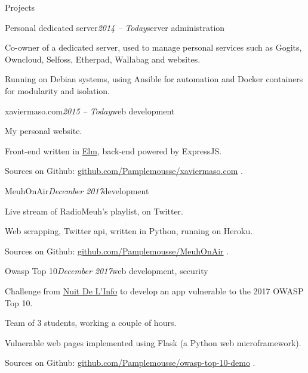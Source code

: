 \begin{rSection}{Projects}

  \begin{rSubsection}{Personal dedicated server}{\em 2014 -- Today}{server administration}{}
    \item[] Co-owner of a dedicated server, used to manage personal services such as Gogits, Owncloud, Selfoss, Etherpad, Wallabag and websites.
    \item Running on Debian systems, using Ansible for automation and Docker containers for modularity and isolation.
  \end{rSubsection}

  \begin{rSubsection}{xaviermaso.com}{\em 2015 -- Today}{web development}{}
    \item[] My personal website.
    \item Front-end written in \href{http://elm-lang.org/}{Elm}, back-end powered by ExpressJS.
    \item Sources on Github: \href{https://github.com/Pamplemousse/xaviermaso.com}{github.com/Pamplemousse/xaviermaso.com} .
  \end{rSubsection}

  \begin{rSubsection}{MeuhOnAir}{\em December 2017}{development}{}
    \item[] Live stream of RadioMeuh's playlist, on Twitter.
    \item Web scrapping, Twitter api, written in Python, running on Heroku.
    \item Sources on Github: \href{https://github.com/Pamplemousse/MeuhOnAir}{github.com/Pamplemousse/MeuhOnAir} .
  \end{rSubsection}

  \begin{rSubsection}{Owasp Top 10}{\em December 2017}{web development, security}{}
    \item[] Challenge from \href{https://www.nuitdelinfo.com/}{Nuit De L'Info} to develop an app vulnerable to the 2017 OWASP Top 10.
    \item Team of 3 students, working a couple of hours.
    \item Vulnerable web pages implemented using Flask (a Python web microframework).
    \item Sources on Github: \href{https://github.com/Pamplemousse/owasp-top-10-demo}{github.com/Pamplemousse/owasp-top-10-demo} .
  \end{rSubsection}


\end{rSection}
